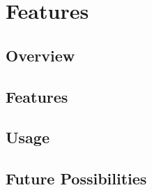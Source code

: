 
\chapter{Features}

\label{ch:features}


\section{Overview}\label{sec:overview}


\section{Features}\label{sec:features}


\section{Usage}\label{sec:usage}


\section{Future Possibilities}\label{sec:future}

